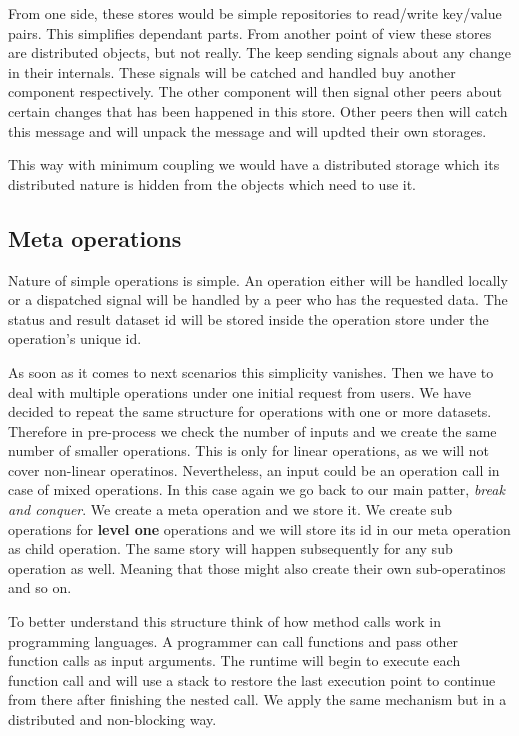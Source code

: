 From one side, these stores would be simple repositories to read/write key/value pairs.
This simplifies dependant parts.
From another point of view these stores are distributed objects, but not really.
The keep sending signals about any change in their internals.
These signals will be catched and handled buy another component respectively.
The other component will then signal other peers about certain changes that has been happened in this store.
Other peers then will catch this message and will unpack the message and will updted their own storages.

This way with minimum coupling we would have a distributed storage which its distributed nature is hidden from
the objects which need to use it.

\subsection{Meta operations}
Nature of simple operations is simple. 
An operation either will be handled locally or a dispatched signal will be handled
by a peer who has the requested data. 
The status and result dataset id will be stored inside the operation store under the operation's unique id.

As soon as it comes to next scenarios this simplicity vanishes. 
Then we have to deal with multiple operations under one initial request from users.
We have decided to repeat the same structure for operations with one or more datasets.
Therefore in pre-process we check the number of inputs and we create the same number of
smaller operations. 
This is only for linear operations, as we will not cover non-linear operatinos.
Nevertheless, an input could be an operation call in case of mixed operations.
In this case again we go back to our main patter, \textit{break and conquer}. 
We create a meta operation and we store it. 
We create sub operations for \textbf{level one} operations and we will store its id 
in our meta operation as child operation. 
The same story will happen subsequently for any sub operation as well. 
Meaning that those might also create their own sub-operatinos and so on.

To better understand this structure think of how method calls work in programming languages.
A programmer can call functions and pass other function calls as input arguments.
The runtime will begin to execute each function call and will use a stack to restore
the last execution point to continue from there after finishing the nested call.
We apply the same mechanism but in a distributed and non-blocking way.

